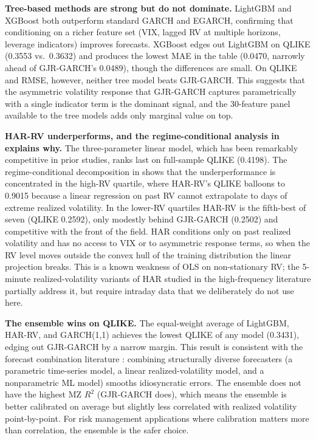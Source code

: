 \textbf{Tree-based methods are strong but do not dominate.} LightGBM and XGBoost both outperform standard GARCH and EGARCH, confirming that conditioning on a richer feature set (VIX, lagged RV at multiple horizons, leverage indicators) improves forecasts. XGBoost edges out LightGBM on QLIKE (0.3553 vs.\ 0.3632) and produces the lowest MAE in the table (0.0470, narrowly ahead of GJR-GARCH's 0.0489), though the differences are small. On QLIKE and RMSE, however, neither tree model beats GJR-GARCH. This suggests that the asymmetric volatility response that GJR-GARCH captures parametrically with a single indicator term is the dominant signal, and the 30-feature panel available to the tree models adds only marginal value on top.

\textbf{HAR-RV underperforms, and the regime-conditional analysis in  explains why.} The three-parameter linear model, which has been remarkably competitive in prior studies, ranks last on full-sample QLIKE (0.4198). The regime-conditional decomposition in  shows that the underperformance is concentrated in the high-RV quartile, where HAR-RV's QLIKE balloons to 0.9015 because a linear regression on past RV cannot extrapolate to days of extreme realized volatility. In the lower-RV quartiles HAR-RV is the fifth-best of seven (QLIKE 0.2592), only modestly behind GJR-GARCH (0.2502) and competitive with the front of the field. HAR conditions only on past realized volatility and has no access to VIX or to asymmetric response terms, so when the RV level moves outside the convex hull of the training distribution the linear projection breaks. This is a known weakness of OLS on non-stationary RV; the 5-minute realized-volatility variants of HAR studied in the high-frequency literature partially address it, but require intraday data that we deliberately do not use here.

\textbf{The ensemble wins on QLIKE.} The equal-weight average of LightGBM, HAR-RV, and GARCH(1,1) achieves the lowest QLIKE of any model (0.3431), edging out GJR-GARCH by a narrow margin. This result is consistent with the forecast combination literature \citep{Timmermann2006}: combining structurally diverse forecasters (a parametric time-series model, a linear realized-volatility model, and a nonparametric ML model) smooths idiosyncratic errors. The ensemble does not have the highest MZ $R^2$ (GJR-GARCH does), which means the ensemble is better calibrated on average but slightly less correlated with realized volatility point-by-point. For risk management applications where calibration matters more than correlation, the ensemble is the safer choice.

